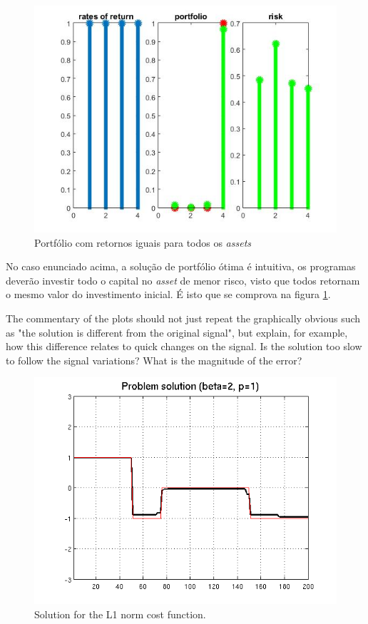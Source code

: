 \documentclass[a4paper]{IEEEtran}
\begin{document}
\begin{itemize}
\begin{figure}[htp]
\captionsetup{font=scriptsize}  
  \centering
  \includegraphics[width=0.9\columnwidth]{./miu_igual_risco_diferente}
  \caption{Portfólio com retornos iguais para todos os \textit{assets}}
  \label{fig:caso4}
\end{figure}

No caso enunciado acima, a solução de portfólio ótima é intuitiva, os programas deverão investir todo o capital no \textit{asset} de menor risco, visto que todos retornam o mesmo valor do investimento inicial. É isto que se comprova na figura \ref{fig:caso4}.

\end{itemize} 


The commentary of the plots should not just repeat the graphically
obvious such as "the solution is different from the original signal",
but explain, for example, how this difference relates to quick changes
on the signal. Is the solution too slow to follow the signal
variations? What is the magnitude of the error?

\begin{figure}[htp]
  \centering
  \includegraphics[width=0.9\columnwidth]{./solution1}
  \caption{Solution for the L1 norm cost function.}
  \label{fig:solution-l1}
\end{figure}
\end{document}
